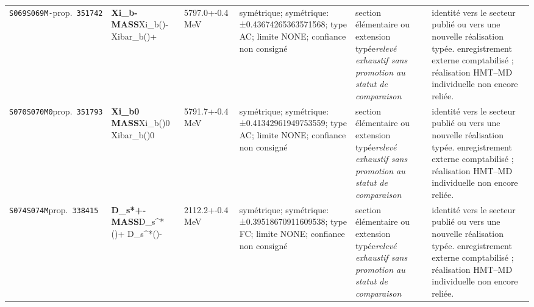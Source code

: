 \begin{landscape}
\begin{longtable}{L{1.85cm}L{4.45cm}L{2.35cm}L{4.05cm}L{3.35cm}L{7.15cm}}
\texttt{S069}\newline \texttt{S069M-}\newline prop.\ \texttt{351742} & \textbf{Xi\_\allowbreak{}b- MASS}\newline Xi\_\allowbreak{}b()- \textbar{}\allowbreak{} Xibar\_\allowbreak{}b()+ & 5797.0+-0.4\,MeV & symétrique; symétrique: ±0.43674265363571568; type AC; limite NONE; confiance non consigné & section élémentaire ou extension typée\newline \emph{relevé exhaustif sans promotion au statut de comparaison} & identité vers le secteur publié ou vers une nouvelle réalisation typée. enregistrement externe comptabilisé ; réalisation HMT--MD individuelle non encore reliée. \\
\texttt{S070}\newline \texttt{S070M0}\newline prop.\ \texttt{351793} & \textbf{Xi\_\allowbreak{}b0 MASS}\newline Xi\_\allowbreak{}b()0 \textbar{}\allowbreak{} Xibar\_\allowbreak{}b()0 & 5791.7+-0.4\,MeV & symétrique; symétrique: ±0.41342961949753559; type AC; limite NONE; confiance non consigné & section élémentaire ou extension typée\newline \emph{relevé exhaustif sans promotion au statut de comparaison} & identité vers le secteur publié ou vers une nouvelle réalisation typée. enregistrement externe comptabilisé ; réalisation HMT--MD individuelle non encore reliée. \\
\texttt{S074}\newline \texttt{S074M}\newline prop.\ \texttt{338415} & \textbf{D\_\allowbreak{}s*+- MASS}\newline D\_\allowbreak{}s\textasciicircum{}*()+ \textbar{}\allowbreak{} D\_\allowbreak{}s\textasciicircum{}*()- & 2112.2+-0.4\,MeV & symétrique; symétrique: ±0.39518670911609538; type FC; limite NONE; confiance non consigné & section élémentaire ou extension typée\newline \emph{relevé exhaustif sans promotion au statut de comparaison} & identité vers le secteur publié ou vers une nouvelle réalisation typée. enregistrement externe comptabilisé ; réalisation HMT--MD individuelle non encore reliée. \\

\end{longtable}
\end{landscape}
